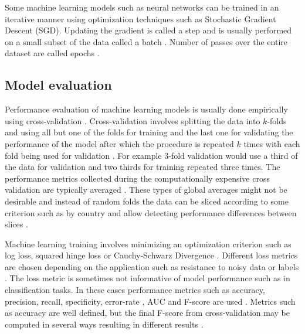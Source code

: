 Some machine learning models such as neural networks can be trained in an iterative manner using optimization techniques such as Stochastic Gradient Descent (SGD).  Updating the gradient is called a step and is usually performed on a small subset of the data called a batch \parencite{shallueMeasuringEffectsData2019}. Number of passes over the entire dataset are called epochs \parencite{shallueMeasuringEffectsData2019}.

\subsection{Model evaluation}
\label{sec:mlperf}

Performance evaluation of machine learning models is usually done empirically using cross-validation \parencite{formanApplestoApplesCrossValidationStudies,sokolovaSystematicAnalysisPerformance2009}. Cross-validation involves splitting the data into $k$-folds and using all but one of the folds for training and the last one for validating the performance of the model after which the procedure is repeated $k$ times with each fold being used for validation \parencite{cawleyOverfittingModelSelection}. For example $3$-fold validation would use a third of the data for validation and two thirds for training repeated three times. The performance metrics collected during the computationally expensive cross validation are typically averaged \parencite{cawleyOverfittingModelSelection}. These types of global averages might not be desirable and instead of random folds the data can be sliced according to some criterion such as by country and allow detecting performance differences between slices \parencite{breckMLTestScore2017a}.

Machine learning training involves minimizing an optimization criterion such as log loss, squared hinge loss or Cauchy-Schwarz Divergence \parencite{janochaLossFunctionsDeep2017}. Different loss metrics are chosen depending on the application such as resistance to noisy data or labels \parencite{janochaLossFunctionsDeep2017}. The loss metric is sometimes not informative of model performance such as in classification tasks. In these cases performance metrics such as accuracy, precision, recall, specificity, error-rate , AUC and F-score are used \parencite{sokolovaSystematicAnalysisPerformance2009,formanApplestoApplesCrossValidationStudies}. Metrics such as accuracy are well defined, but the final F-score from cross-validation may be computed in several ways resulting in different results \parencite{formanApplestoApplesCrossValidationStudies}.

